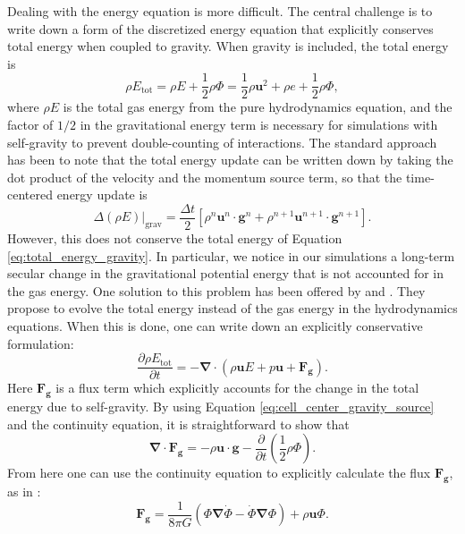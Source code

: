 \documentclass{emulateapj}
\begin{document}
Dealing with the energy equation is more difficult. The central
challenge is to write down a form of the discretized energy equation
that explicitly conserves total energy when coupled to gravity. When
gravity is included, the total energy is
\begin{equation}
  \rho E_{\text{tot}} = \rho E + \frac{1}{2}\rho\Phi = \frac{1}{2}\rho \mathbf{u}^2 + \rho e + \frac{1}{2}\rho\Phi, \label{eq:total_energy_gravity}
\end{equation}
where $\rho E$ is the total gas energy from the pure hydrodynamics equation,
and the factor of $1/2$ in the gravitational energy term is necessary
for simulations with self-gravity to prevent double-counting of
interactions. The standard approach has been to note that the total energy update
can be written down by taking the dot product of the velocity and the momentum source term,
so that the time-centered energy update is
\begin{equation}
  \left.\Delta (\rho E)\right|_\text{grav} = \frac{\Delta t}{2} \left[ \rho^n \mathbf{u}^n \cdot \mathbf{g}^n + \rho^{n+1} \mathbf{u}^{n+1} \cdot \mathbf{g}^{n+1}\right].
\end{equation}
However, this does not conserve the total energy of Equation \ref{eq:total_energy_gravity}.
In particular, we notice in our simulations a long-term secular change in the gravitational potential energy
that is not accounted for in the gas energy. One solution to this problem has been offered by 
\cite{jiang:2013} and \cite{marcello:2012}. They propose to evolve the total energy instead of the gas energy 
in the hydrodynamics equations. When this is done, one can write down an explicitly conservative 
formulation:
\begin{equation}
  \frac{\partial \rho E_{\text{tot}}}{\partial t} = -\bm{\nabla}\cdot(\rho\mathbf{u}E + p\mathbf{u} + \mathbf{F_g}).
\end{equation}
Here $\mathbf{F_g}$ is a flux term which explicitly accounts for the change in the total energy due to self-gravity. 
By using Equation \ref{eq:cell_center_gravity_source} and the continuity equation, it is straightforward to show that
\begin{equation}
  {\bm\nabla} \cdot \mathbf{F_g} = -\rho \mathbf{u} \cdot \mathbf{g} - \frac{\partial}{\partial t}\left(\frac{1}{2}\rho\Phi\right). \label{eq:gradient_F_g}
\end{equation}
From here one can use the continuity equation to explicitly calculate the flux $\mathbf{F_g}$, as in \cite{jiang:2013}:
\begin{equation}
  \mathbf{F_g} = \frac{1}{8\pi G}\left(\Phi\bm{\nabla}\dot{\Phi} - \dot{\Phi}\bm{\nabla}\Phi\right) + \rho\mathbf{u}\Phi \label{eq:jiang_flux}.
\end{equation}
\end{document}

